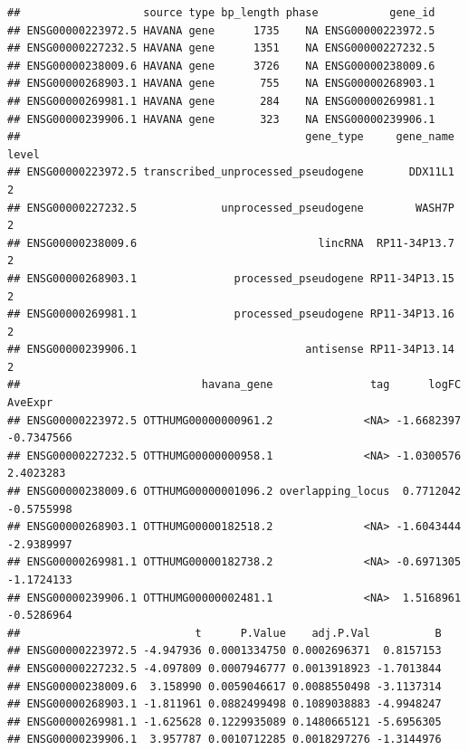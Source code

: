 \documentclass[
]{article}
\newenvironment{Shaded}{\begin{snugshade}}{\end{snugshade}}
\newcommand{\DocumentationTok}[1]{\textcolor[rgb]{0.56,0.35,0.01}{\textbf{\textit{#1}}}}
\newcommand{\FloatTok}[1]{\textcolor[rgb]{0.00,0.00,0.81}{#1}}
\newcommand{\FunctionTok}[1]{\textcolor[rgb]{0.13,0.29,0.53}{\textbf{#1}}}
\newcommand{\NormalTok}[1]{#1}
\newcommand{\SpecialCharTok}[1]{\textcolor[rgb]{0.81,0.36,0.00}{\textbf{#1}}}
\begin{document}
\begin{verbatim}
##                   source type bp_length phase           gene_id
## ENSG00000223972.5 HAVANA gene      1735    NA ENSG00000223972.5
## ENSG00000227232.5 HAVANA gene      1351    NA ENSG00000227232.5
## ENSG00000238009.6 HAVANA gene      3726    NA ENSG00000238009.6
## ENSG00000268903.1 HAVANA gene       755    NA ENSG00000268903.1
## ENSG00000269981.1 HAVANA gene       284    NA ENSG00000269981.1
## ENSG00000239906.1 HAVANA gene       323    NA ENSG00000239906.1
##                                            gene_type     gene_name level
## ENSG00000223972.5 transcribed_unprocessed_pseudogene       DDX11L1     2
## ENSG00000227232.5             unprocessed_pseudogene        WASH7P     2
## ENSG00000238009.6                            lincRNA  RP11-34P13.7     2
## ENSG00000268903.1               processed_pseudogene RP11-34P13.15     2
## ENSG00000269981.1               processed_pseudogene RP11-34P13.16     2
## ENSG00000239906.1                          antisense RP11-34P13.14     2
##                            havana_gene               tag      logFC    AveExpr
## ENSG00000223972.5 OTTHUMG00000000961.2              <NA> -1.6682397 -0.7347566
## ENSG00000227232.5 OTTHUMG00000000958.1              <NA> -1.0300576  2.4023283
## ENSG00000238009.6 OTTHUMG00000001096.2 overlapping_locus  0.7712042 -0.5755998
## ENSG00000268903.1 OTTHUMG00000182518.2              <NA> -1.6043444 -2.9389997
## ENSG00000269981.1 OTTHUMG00000182738.2              <NA> -0.6971305 -1.1724133
## ENSG00000239906.1 OTTHUMG00000002481.1              <NA>  1.5168961 -0.5286964
##                           t      P.Value    adj.P.Val          B
## ENSG00000223972.5 -4.947936 0.0001334750 0.0002696371  0.8157153
## ENSG00000227232.5 -4.097809 0.0007946777 0.0013918923 -1.7013844
## ENSG00000238009.6  3.158990 0.0059046617 0.0088550498 -3.1137314
## ENSG00000268903.1 -1.811961 0.0882499498 0.1089038883 -4.9948247
## ENSG00000269981.1 -1.625628 0.1229935089 0.1480665121 -5.6956305
## ENSG00000239906.1  3.957787 0.0010712285 0.0018297276 -1.3144976
\end{verbatim}

\begin{Shaded}
\end{Shaded}
\end{document}
